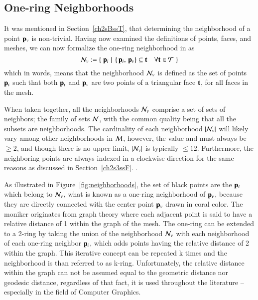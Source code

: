 \subsection{One-ring Neighborhoods}
\label{ch2s3ssORN}
It was mentioned in Section~\ref{ch2sBssT}, that determining the neighborhood of a point $\mathbf{p}_v$ is non-trivial. Having now examined the definitions of points, faces, and meshes, we can now formalize the one-ring neighborhood in \tdd{} as
%
\begin{equation}
	\mathcal{N}_v := \left \{\;\mathbf{p}_i\;|\;\left \{\,\mathbf{p}_i,\,\mathbf{p}_v\right \} \subseteq \mathbf{t} \quad \forall \mathbf{t} \in \mathcal{T}\;\right \}
	\label{eq:defineNeighborhood}
\end{equation}%
%
%
%
which in words, means that the neighborhood $\mathcal{N}_v$ is defined as the set of points $\mathbf{p}_i$ such that both $\mathbf{p}_i$ and $\mathbf{p}_v$ are two points of a triangular face $\mathbf{t}$, for all faces in the mesh.

When taken together, all the neighborhoods $\mathcal{N}_v$ comprise a set of sets of neighbors; the family of sets $\mathcal{N}$, with the common quality being that all the subsets are neighborhoods. The cardinality of each neighborhood $|\mathcal{N}_v|$ will likely vary among other neighborhoods in $\mathcal{M}$, however, the value and must always be $\geq 2$, and though there is no upper limit, $|\mathcal{N}_v|$ is typically $\leq 12$. Furthermore, the neighboring points are always indexed in a clockwise direction for the same reasons as discussed in Section~\ref{ch2s3ssF}.
%
.%

As illustrated in Figure~\ref{fig:neighborhoods}, the set of black points are the $\mathbf{p}_i$ which belong to $\mathcal{N}_v$, what is known as a one-ring neighborhood of $\mathbf{p}_v$, because they are directly connected with the center point $\mathbf{p}_v$ drawn in coral color. The moniker originates from graph theory where each adjacent point is said to have a relative distance of 1 within the graph of the mesh. The one-ring can be extended to a 2-ring by taking the union of the neighborhood $\mathcal{N}_v$ with each neighborhood of each one-ring neighbor $\mathbf{p}_i$, which adds points having the relative distance of 2 within the graph. This iterative concept can be repeated k times and the neighborhood is than referred to as k-ring. Unfortunately, the relative distance within the graph can not be assumed equal to the geometric distance nor geodesic distance, regardless of that fact, it is used throughout the literature – especially in the field of Computer Graphics.~\cite[p.~29]{Mara12}

